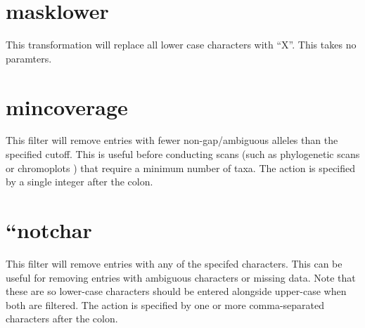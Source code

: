 \documentclass[letterpaper,11pt,english]{sphinxmanual}
\begin{document}
%
\begin{sphinxVerbatim}[commandchars=\\\{\}]
  
 
 
\end{sphinxVerbatim}


\section{masklower}
\label{\detokenize{mvf_filter_modules:masklower}}
This transformation will replace all lower case characters with “X”.
This takes no paramters.

%
\begin{sphinxVerbatim}[commandchars=\\\{\}]
  
 
 
\end{sphinxVerbatim}


\section{mincoverage}
\label{\detokenize{mvf_filter_modules:mincoverage}}
This filter will remove entries with fewer non-gap/ambiguous alleles
than the specified cutoff. This is useful before conducting scans
(such as phylogenetic scans or chromoplots ) that require a minimum
number of taxa.  The action is specified by a single integer after
the colon.

%
\begin{sphinxVerbatim}[commandchars=\\\{\}]
  
 
 
\end{sphinxVerbatim}


\section{“notchar}
\label{\detokenize{mvf_filter_modules:notchar}}
This filter will remove entries with any of the specifed characters.
This can be useful for removing entries with ambiguous characters
or missing data.  Note that these are  so lower-case
characters should be entered alongside upper-case when both are
filtered.  The action is specified by one or more comma-separated
characters after the colon.
\end{document}
